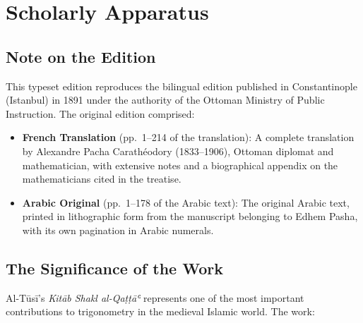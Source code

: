 \documentclass[11pt,a4paper]{article}
\theoremstyle{plain}
\theoremstyle{definition}
\theoremstyle{remark}
\begin{document}
\section*{Scholarly Apparatus}




\subsection*{Note on the Edition}



This typeset edition reproduces the bilingual edition published in Constantinople (Istanbul) in 1891 under the authority of the Ottoman Ministry of Public Instruction. The original edition comprised:



\begin{itemize}

\item \textbf{French Translation} (pp.~1--214 of the translation): A complete translation by Alexandre Pacha Carathéodory (1833--1906), Ottoman diplomat and mathematician, with extensive notes and a biographical appendix on the mathematicians cited in the treatise.

\item \textbf{Arabic Original} (pp.~1--178 of the Arabic text): The original Arabic text, printed in lithographic form from the manuscript belonging to Edhem Pasha, with its own pagination in Arabic numerals.

\end{itemize}



\subsection*{The Significance of the Work}



Al-Tūsī's \textit{Kitāb Shakl al-Qaṭṭāʿ} represents one of the most important contributions to trigonometry in the medieval Islamic world. The work:
\end{document}
